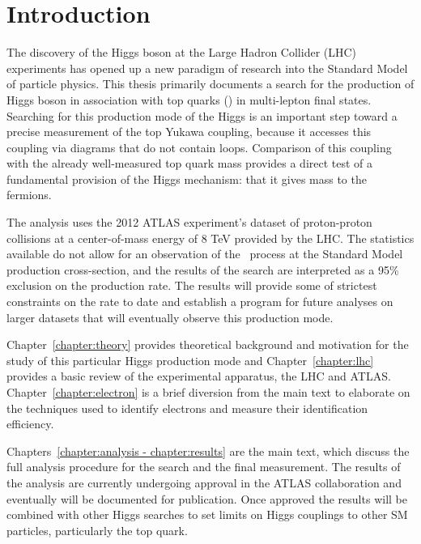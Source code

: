 \chapter[Introduction][Introduction]{Introduction}

The discovery of the Higgs boson at the Large Hadron Collider (LHC) experiments has opened up a new paradigm of research into the
Standard Model of particle physics.
This thesis primarily documents a search for the production of Higgs boson in association with top quarks (\tth) 
in multi-lepton final states.  Searching for this production mode of the Higgs is an important
step toward a precise measurement of the top Yukawa coupling, because it accesses this coupling via diagrams
that do not contain loops. Comparison of this coupling with the already well-measured top quark mass provides
a direct test of a fundamental provision of the Higgs mechanism: that it gives mass to the fermions. 

The analysis uses the 2012 ATLAS experiment's dataset of proton-proton collisions at 
a center-of-mass energy of 8 TeV provided by the LHC. The statistics available do not allow for an observation of the \tth\ process
at the Standard Model production cross-section, and the results of the search are interpreted as
a 95\% exclusion on the production rate. The results will provide some of strictest constraints on the rate to date and
establish a program for future analyses on larger datasets that will eventually observe this production mode. 

Chapter~\ref{chapter:theory} provides theoretical background and motivation for the study of this particular
Higgs production mode and Chapter~\ref{chapter:lhc} provides a basic review of the experimental apparatus,
the LHC and ATLAS. Chapter~\ref{chapter:electron} is a brief diversion
from the main text to elaborate on the techniques used to identify electrons and measure their identification
efficiency. 

Chapters~\ref{chapter:analysis - chapter:results} are the main text, which discuss the full analysis
procedure for the search and the final measurement. The results of the analysis are currently undergoing approval
in the ATLAS collaboration and eventually will be documented for publication. Once approved the results
will be combined with other Higgs searches to set limits on Higgs couplings to other SM particles,
particularly the top quark. 
